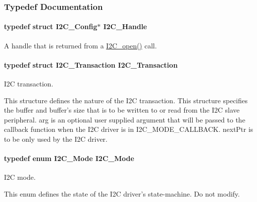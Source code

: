 \subsubsection{Typedef Documentation}
\paragraph[{I2\-C\-\_\-\-Handle}]{\setlength{\rightskip}{0pt plus 5cm}typedef struct {\bf I2\-C\-\_\-\-Config}$\ast$ {\bf I2\-C\-\_\-\-Handle}}\label{_i2_c_8h_a5809a229f8395c87f59e63128195c1bf}


A handle that is returned from a \hyperlink{_i2_c_8h_ae1aa99e1fee4517406018e10025cca0e}{I2\-C\-\_\-open()} call. 

\paragraph[{I2\-C\-\_\-\-Transaction}]{\setlength{\rightskip}{0pt plus 5cm}typedef struct {\bf I2\-C\-\_\-\-Transaction}  {\bf I2\-C\-\_\-\-Transaction}}\label{_i2_c_8h_a54d2d506a10628451340a2901bdb6277}


I2\-C transaction. 

This structure defines the nature of the I2\-C transaction. This structure specifies the buffer and buffer's size that is to be written to or read from the I2\-C slave peripheral. arg is an optional user supplied argument that will be passed to the callback function when the I2\-C driver is in I2\-C\-\_\-\-M\-O\-D\-E\-\_\-\-C\-A\-L\-L\-B\-A\-C\-K. next\-Ptr is to be only used by the I2\-C driver. 
\paragraph[{I2\-C\-\_\-\-Mode}]{\setlength{\rightskip}{0pt plus 5cm}typedef enum {\bf I2\-C\-\_\-\-Mode}  {\bf I2\-C\-\_\-\-Mode}}\label{_i2_c_8h_ae55a8b6a859a48b93b7ad0472da42fcc}


I2\-C mode. 

This enum defines the state of the I2\-C driver's state-\/machine. Do not modify. 
